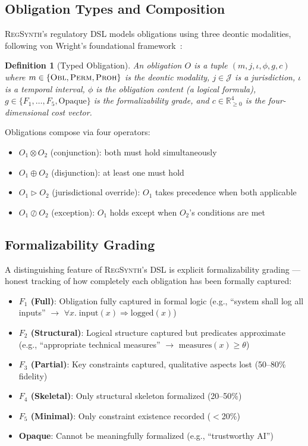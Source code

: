 \documentclass[11pt,twocolumn]{article}
\newtheorem{definition}{Definition}
\newcommand{\regsynth}{\textsc{RegSynth}}
\newcommand{\obl}{\textsc{Obl}}
\newcommand{\perm}{\textsc{Perm}}
\newcommand{\proh}{\textsc{Proh}}
\newcommand{\tensor}{\otimes}
\newcommand{\disjunction}{\oplus}
\newcommand{\override}{\triangleright}
\newcommand{\except}{\oslash}
\begin{document}
\subsection{Obligation Types and Composition}

\regsynth{}'s regulatory DSL models obligations using three deontic modalities,
following von Wright's foundational framework~\cite{vonwright1951}:

\begin{definition}[Typed Obligation]
An obligation $O$ is a tuple $(m, j, \iota, \phi, g, c)$ where
$m \in \{\obl, \perm, \proh\}$ is the deontic modality,
$j \in \mathcal{J}$ is a jurisdiction,
$\iota$ is a temporal interval,
$\phi$ is the obligation content (a logical formula),
$g \in \{F_1, \ldots, F_5, \text{Opaque}\}$ is the formalizability grade, and
$c \in \mathbb{R}^4_{\geq 0}$ is the four-dimensional cost vector.
\end{definition}

Obligations compose via four operators:

\begin{itemize}[nosep,leftmargin=*]
  \item $O_1 \tensor O_2$ (conjunction): both must hold simultaneously
  \item $O_1 \disjunction O_2$ (disjunction): at least one must hold
  \item $O_1 \override O_2$ (jurisdictional override): $O_1$ takes precedence when both applicable
  \item $O_1 \except O_2$ (exception): $O_1$ holds except when $O_2$'s conditions are met
\end{itemize}

\subsection{Formalizability Grading}

A distinguishing feature of \regsynth{}'s DSL is explicit formalizability
grading — honest tracking of how completely each obligation has been formally
captured:

\begin{itemize}[nosep,leftmargin=*]
  \item \textbf{$F_1$ (Full)}: Obligation fully captured in formal logic (e.g.,
    ``system shall log all inputs'' $\rightarrow$ $\forall x.\;\text{input}(x) \Rightarrow \text{logged}(x)$)
  \item \textbf{$F_2$ (Structural)}: Logical structure captured but predicates
    approximate (e.g., ``appropriate technical measures'' $\rightarrow$ $\text{measures}(x) \geq \theta$)
  \item \textbf{$F_3$ (Partial)}: Key constraints captured, qualitative aspects
    lost (50--80\% fidelity)
  \item \textbf{$F_4$ (Skeletal)}: Only structural skeleton formalized (20--50\%)
  \item \textbf{$F_5$ (Minimal)}: Only constraint existence recorded ($<$20\%)
  \item \textbf{Opaque}: Cannot be meaningfully formalized (e.g., ``trustworthy AI'')
\end{itemize}
\end{document}
